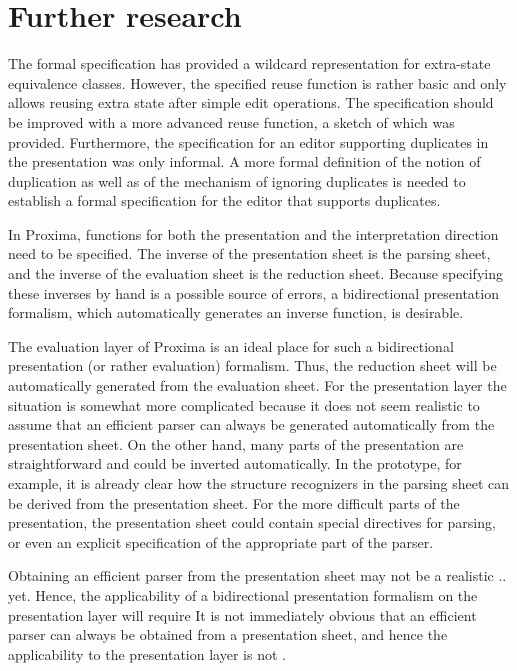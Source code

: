 \section{Further research}

The formal specification has provided a wildcard representation for extra-state equivalence classes. However, the specified reuse function is rather basic and only allows reusing extra state after simple edit operations. The specification should be improved with a more advanced reuse function, a sketch of which was provided. 
Furthermore, the specification for an editor supporting duplicates in the presentation was only informal. A more formal definition of the notion of duplication as well as of the mechanism of ignoring duplicates is needed to establish a formal specification for the editor that supports duplicates. 

In Proxima, functions for both the presentation and the interpretation direction need to be specified. The inverse of the presentation sheet is the parsing sheet, and the inverse of the evaluation sheet is the reduction sheet. Because specifying these inverses by hand is a possible source of errors, a bidirectional presentation formalism, which automatically generates an inverse function, is desirable. 

The evaluation layer of Proxima is an ideal place for such  a bidirectional presentation (or rather evaluation) formalism. Thus, the reduction sheet will be automatically generated from the evaluation sheet. For the presentation layer the situation is somewhat more complicated because it does not seem realistic to assume that an efficient parser can always be generated automatically from the presentation sheet. On the other hand, many parts of the presentation are straightforward and could be inverted automatically. In the prototype, for example, it is already clear how the structure recognizers in the parsing sheet can be derived from the presentation sheet. For the more difficult parts of the presentation, the presentation sheet could contain special directives for parsing, or even an explicit specification of the appropriate part of the parser.


\bc Obtaining an efficient parser from the presentation sheet may not be a realistic .. yet. Hence, the applicability of a bidirectional presentation formalism on the presentation layer will require It is not immediately obvious that an efficient parser can always be obtained from a presentation sheet, and hence the applicability to the presentation layer is not . \ec

